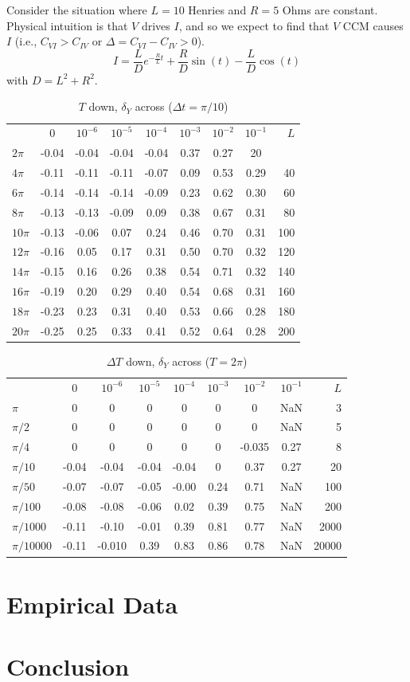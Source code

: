 \documentclass[a4paper,11pt,twocolumn]{article}
\begin{document}
Consider the situation where $L=10$ Henries and $R=5$ Ohms are constant.  Physical intuition is that $V$ drives $I$, and so we expect to find that $V$ CCM causes $I$ (i.e., $C_{VI}>C_{IV}$ or $\Delta = C_{VI}-C_{IV} > 0$). 
\begin{equation}
I = \frac{L}{D}e^{-\frac{R}{L}t}+\frac{R}{D}\sin(t)-\frac{L}{D}\cos(t)
\end{equation}
with $D = L^2 + R^2$.   
\begin{table}
\begin{tabular}{l|ccccccc|r}
 &0 & $10^{-6}$ & $10^{-5}$ & $10^{-4}$  & $10^{-3}$  & $10^{-2}$  & $10^{-1}$  & $L$ \\
$2\pi$ &-0.04	& -0.04& -0.04&-0.04 & 0.37 & 0.27 & 20\\
$4\pi$ &-0.11 & -0.11 & -0.11 & -0.07 & 0.09 &	0.53 & 0.29 & 40 \\
$6\pi$ &-0.14 & -0.14 & -0.14 & -0.09 & 0.23 &	0.62 & 0.30 & 60\\
$8\pi$ &-0.13 & -0.13 & -0.09 & 0.09 &	0.38 &	0.67 & 0.31 & 80\\
$10\pi$ &-0.13 & -0.06 & 0.07 &	0.24 &	0.46 &	0.70 & 0.31 & 100\\
$12\pi$ &-0.16 & 0.05 &	0.17 & 0.31 & 0.50 & 0.70 &	0.32 & 120\\
$14\pi$ &-0.15 & 0.16 &	0.26 & 0.38 & 0.54 & 0.71 &	0.32 & 140\\
$16\pi$ &-0.19 & 0.20 &	0.29 & 0.40 & 0.54 & 0.68 &	0.31 & 160\\
$18\pi$ &-0.23 & 0.23 &	0.31 & 0.40 & 0.53 & 0.66 &	0.28 & 180\\
$20\pi$ &-0.25 & 0.25 &	0.33 & 0.41 & 0.52 & 0.64 &	0.28 & 200
\end{tabular}
\caption{$T$ down, $\delta_Y$ across ($\Delta t=\pi/10$)}
\end{table}
\begin{table}
\begin{tabular}{l|ccccccc|r}
 &0 & $10^{-6}$ & $10^{-5}$ & $10^{-4}$  & $10^{-3}$  & $10^{-2}$  & $10^{-1}$  & $L$ \\
$\pi$ & 0 & 0 & 0 & 0 & 0 & 0 & NaN & 3 \\ 
$\pi/2$ & 0 & 0 & 0 & 0 & 0 & 0 & NaN & 5 \\
$\pi/4$ & 0 & 0 & 0 & 0 & 0 & -0.035 & 0.27 & 8 \\ 
$\pi/10$ & -0.04 & -0.04 & -0.04 & -0.04 & 0 & 0.37 & 0.27 & 20 \\
$\pi/50$ & -0.07 & -0.07 & -0.05 & -0.00 & 0.24 & 0.71 & NaN & 100 \\
$\pi/100$ & -0.08 & -0.08 & -0.06 & 0.02 & 0.39 & 0.75 & NaN & 200 \\
$\pi/1000$ & -0.11 & -0.10 & -0.01 & 0.39 & 0.81 & 0.77 & NaN & 2000 \\
$\pi/10000$ & -0.11 & -0.010 & 0.39 & 0.83 & 0.86 & 0.78 & NaN & 20000
\end{tabular}
\caption{$\Delta T$ down, $\delta_Y$ across ($T=2\pi$)}
\end{table}

\section{Empirical Data}

\section{Conclusion}

%
%
\end{document}
